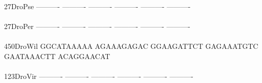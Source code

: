 \documentclass[11pt,twoside,reqno,a4paper]{article}
\begin{document}
{27\hspace*{3\charwidth}DroPse	----------	----------	----------	----------	----------	----------	\\
\hspace*{5\charwidth}\hspace*{7\charwidth}\hspace*{1\charwidth}\hspace*{1\charwidth}\hspace*{1\charwidth}\hspace*{1\charwidth}\hspace*{1\charwidth}\hspace*{1\charwidth}\\
27\hspace*{3\charwidth}DroPer	----------	----------	----------	----------	----------	----------	\\
\hspace*{5\charwidth}\hspace*{7\charwidth}\hspace*{1\charwidth}\hspace*{1\charwidth}\hspace*{1\charwidth}\hspace*{1\charwidth}\hspace*{1\charwidth}\hspace*{1\charwidth}\\
450\hspace*{2\charwidth}DroWil	GGCATAAAAA	AGAAAGAGAC	GGAAGATTCT	GAGAAATGTC	GAATAAACTT	ACAGGAACAT	\\
\hspace*{5\charwidth}\hspace*{7\charwidth}\hspace*{1\charwidth}\hspace*{1\charwidth}\hspace*{1\charwidth}\hspace*{1\charwidth}\hspace*{1\charwidth}\hspace*{1\charwidth}\\
123\hspace*{2\charwidth}DroVir	----------	----------	----------	----------	----------	----------	\\
\hspace*{5\charwidth}\hspace*{7\charwidth}\hspace*{1\charwidth}\hspace*{1\charwidth}\hspace*{1\charwidth}\hspace*{1\charwidth}\hspace*{1\charwidth}\hspace*{1\charwidth}\\
}
\end{document}
